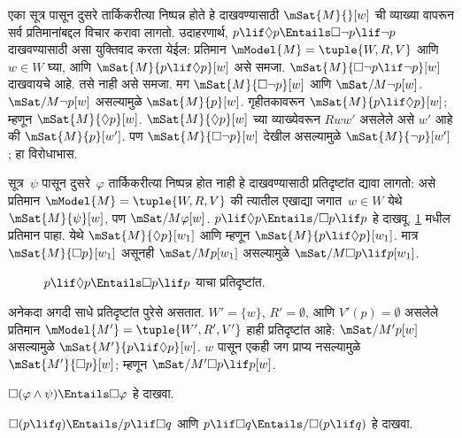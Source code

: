 \begin{ex}
  एका सूत्र पासून दुसरे तार्किकरीत्या निष्पन्न होते हे
  दाखवण्यासाठी $\mSat{M}{}[w]$ ची व्याख्या वापरून सर्व
  प्रतिमानांबद्दल विचार करावा लागतो. उदाहरणार्थ,
  $p \lif \Diamond p \Entails \Box\lnot p \lif \lnot p$
  दाखवण्यासाठी असा युक्तिवाद करता येईल: प्रतिमान
  $\mModel{M} = \tuple{W, R,
    V}$ आणि $w \in W$ घ्या, आणि $\mSat{M}{p \lif \Diamond
    p}[w]$ असे समजा. $\mSat{M}{\Box\lnot p \lif \lnot
    p}[w]$ दाखवायचे आहे. तसे नाही असे समजा. मग
  $\mSat{M}{\Box\lnot p}[w]$ आणि $\mSat/{M}{\lnot p}[w]$.
  $\mSat/{M}{\lnot p}[w]$ असल्यामुळे $\mSat{M}{
    p}[w]$. गृहीतकावरून $\mSat{M}{p \lif \Diamond p}[w]$;
  म्हणून $\mSat{M}{\Diamond p}[w]$.
  $\mSat{M}{\Diamond
    p}[w]$ च्या व्याख्येवरून $Rww'$ असलेले असे $w'$
  आहे की $\mSat{M}{p}[w']$. पण $\mSat{M}{\Box \lnot p}[w]$
  देखील असल्यामुळे $\mSat{M}{\lnot p}[w']$; हा विरोधाभास.

  सूत्र~$\psi$ पासून दुसरे~$\varphi$ तार्किकरीत्या
  निष्पन्न होत नाही हे दाखवण्यासाठी प्रतिदृष्टांत द्यावा
  लागतो: असे प्रतिमान $\mModel{M} = \tuple{W, R,
    V}$ की त्यातील एखाद्या जगात~$w \in W$ येथे
  $\mSat{M}{\psi}[w]$, पण $\mSat/{M}{\varphi}[w]$.
  $p \lif \Diamond p \Entails/
  \Box p \lif p$ हे दाखवू. \ref{nml:syn:ent:fig:counterex} मधील
  प्रतिमान पाहा. येथे $\mSat{M}{\Diamond p}[w_1]$
  आणि म्हणून $\mSat{M}{p \lif
    \Diamond p}[w_1]$. मात्र $\mSat{M}{\Box p}[w_1]$
  असूनही $\mSat/{M}{p}[w_1]$ असल्यामुळे
  $\mSat/{M}{\Box p \lif p}[w_1]$.
  \begin{figure}
  \begin{center}
  \end{center}
  \caption{$p \lif \Diamond p
  \Entails \Box p \lif p$ याचा प्रतिदृष्टांत.}
  \label{nml:syn:ent:fig:counterex}
  \end{figure}

  अनेकदा अगदी साधे प्रतिदृष्टांत पुरेसे असतात.
  $W' = \{w\}$, $R' = \emptyset$, आणि $V'(p) =
  \emptyset$ असलेले प्रतिमान $\mModel{M'} =
  \tuple{W', R', V'}$ हाही प्रतिदृष्टांत आहे:
  $\mSat/{M'}{p}[w]$ असल्यामुळे
  $\mSat{M'}{p \lif \Diamond p}[w]$. $w$ पासून एकही
  जग प्राप्य नसल्यामुळे $\mSat{M'}{\Box p}[w]$; म्हणून
  $\mSat/{M'}{\Box p
    \lif p}[w]$.
\end{ex}

\begin{prob}
  $\Box (\varphi \land \psi) \Entails \Box \varphi$ हे दाखवा.
\end{prob}

\begin{prob}
  $\Box (p \lif q) \Entails/ p \lif \Box q$ आणि $p \lif \Box
  q \Entails/\Box (p \lif q)$ हे दाखवा.
\end{prob}



